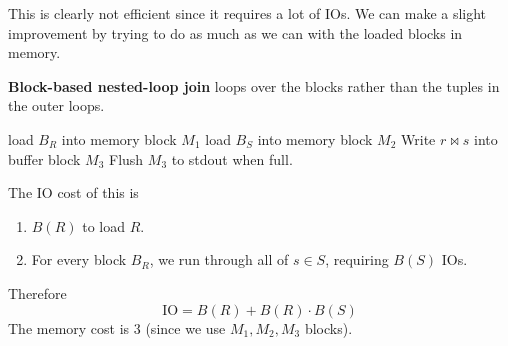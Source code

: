     This is clearly not efficient since it requires a lot of IOs. We can make a slight improvement by trying to do as much as we can with the loaded blocks in memory. 

    \begin{algo}
      \textbf{Block-based nested-loop join} loops over the blocks rather than the tuples in the outer loops.  
      \begin{algorithm}[H]
        \begin{algorithmic}
              \State load $B_R$ into memory block $M_1$ 
                \State load $B_S$ into memory block $M_2$ 
                    \State Write $r \bowtie s$ into buffer block $M_3$ 
                    \State Flush $M_3$ to stdout when full. 
                  \EndIf 
                \EndFor
              \EndFor
            \EndFor
          \EndFunction
        \end{algorithmic}
      \end{algorithm}
      The IO cost of this is 
      \begin{enumerate}
        \item $B(R)$ to load $R$. 
        \item For every block $B_R$, we run through all of $s \in S$, requiring $B(S)$ IOs. 
      \end{enumerate}
      Therefore
      \begin{equation}
        \mathrm{IO} = B(R) + B(R) \cdot B(S)
      \end{equation}
      The memory cost is $3$ (since we use $M_1, M_2, M_3$ blocks). 
    \end{algo}

